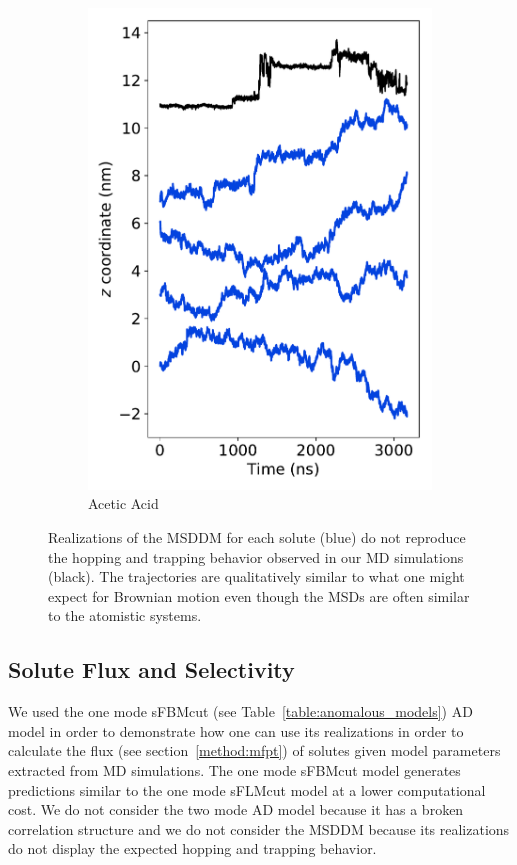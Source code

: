 \documentclass[journal=jctcce,manuscript=article]{achemso}
\begin{document}
\begin{figure}
\begin{subfigure}{0.24\textwidth}
  \includegraphics[width=\textwidth]{stacked_msddm_realizations_ACH.pdf}
  \caption{Acetic Acid}\label{fig:stacked_msddm_realizations_ACH}
  \end{subfigure}
  \caption{Realizations of the MSDDM for each solute (blue) do not reproduce
	  the hopping and trapping behavior observed in our MD simulations
	  (black). The trajectories are qualitatively similar to what one
	  might expect for Brownian motion even though the MSDs are often similar
	  to the atomistic systems.
  	  }\label{fig:msddm_eyetest}
  \end{figure}
  
  \subsection{Solute Flux and Selectivity}\label{section:mfpt}
  
  We used the one mode sFBMcut (see Table~\ref{table:anomalous_models}) AD
  model in order to demonstrate how one can use its realizations in order to
  calculate the flux (see section~\ref{method:mfpt}) of solutes given model
  parameters extracted from MD simulations. The one mode sFBMcut model
  generates predictions similar to the one mode sFLMcut model at a lower
  computational cost. We do not consider the two mode AD model because it has a
  broken correlation structure and we do not consider the MSDDM because its
  realizations do not display the expected hopping and trapping behavior. 
\end{document}

